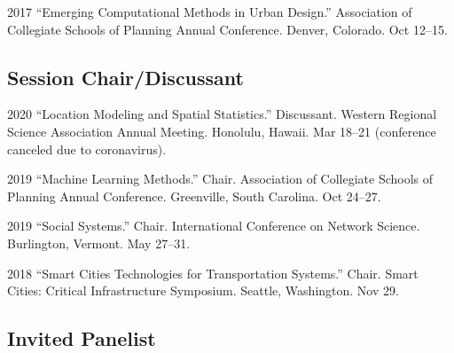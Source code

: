 \documentclass[12pt,letterpaper]{report}
\begin{document}
    \begin{tablist}

        \item[2017] \tab \enquote{Emerging Computational Methods in Urban Design.} Association of Collegiate Schools of Planning Annual Conference. Denver, Colorado. Oct 12--15.

    \end{tablist}

    \subsection*{Session Chair/Discussant}

    \begin{tablist}
    	
    	\item[2020] \tab \enquote{Location Modeling and Spatial Statistics.} Discussant. Western Regional Science Association Annual Meeting. Honolulu, Hawaii. Mar 18--21 (conference canceled due to coronavirus).
    	
        \item[2019] \tab \enquote{Machine Learning Methods.} Chair. Association of Collegiate Schools of Planning Annual Conference. Greenville, South Carolina. Oct 24--27.
        
        \item[2019] \tab \enquote{Social Systems.} Chair. International Conference on Network Science. Burlington, Vermont. May 27--31.
        
        \item[2018] \tab \enquote{Smart Cities Technologies for Transportation Systems.} Chair. Smart Cities: Critical Infrastructure Symposium. Seattle, Washington. Nov 29.

    \end{tablist}

    \subsection*{Invited Panelist}
\end{document}
